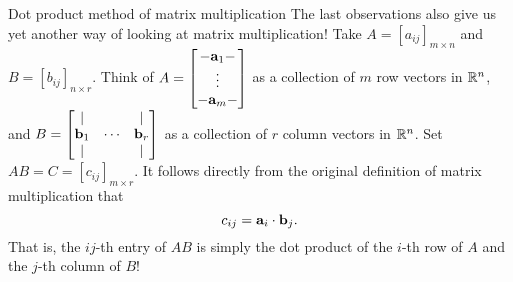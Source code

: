 \begin{frame}{Dot product method of matrix multiplication}
The last observations also give us yet another way of looking at matrix multiplication! 
\bspace
Take $A=[a_{ij}]_{m\times n}$ and $B=[b_{ij}]_{n\times r}$. Think of $A=\begin{bmatrix} -{\mathbf a}_1-\\ \vdots \\ -{\mathbf a}_m-\end{bmatrix}$ as a collection of $m$ {\color{blue}row} vectors in ${\mathbb R}^n$, and $B=\begin{bmatrix}\vert & & \vert\\ {\mathbf b}_1&\cdots &{\mathbf b}_r\\ \vert & & \vert\end{bmatrix}$ as a collection of $r$ {\color{red} column} vectors in ${\mathbb R}^n$. 
\bpause 
Set $AB=C=[c_{ij}]_{m\times r}$. It follows directly from the original definition of matrix multiplication that 
\[
c_{ij}={\mathbf a}_i\cdot{\mathbf b}_j.
\] 
That is, the $ij$-th entry of $AB$ is simply the dot product of the $i$-th row of $A$ and the $j$-th column of $B$!
\end{frame}

